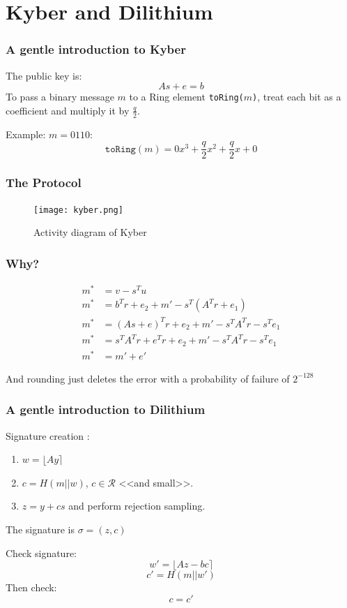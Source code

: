 \documentclass[presentation]{beamer}
\begin{document}
\section{Kyber and Dilithium}
\begin{frame}[label=a-gentle-introduction-to-kyber]
  \frametitle{A gentle introduction to Kyber}
  The public key is:
  \[
    As + e = b
  \]
  To pass a binary message $m$ to a Ring element 
  \texttt{toRing($m$)}, treat each bit as a coefficient and
  multiply it by $\frac{q}{2}$.
  \pause

  Example: $m = 0110$:
  \[
  \texttt{toRing}(m) = 0x^3 + \frac{q}{2}x^2 + \frac{q}{2}x + 0
  \]

\end{frame}
\begin{frame}
  \frametitle{The Protocol}
  \begin{figure}
    \centering
    \texttt{[image: kyber.png]}
    \caption{Activity diagram of Kyber \cite{kyber-spec}}
  \end{figure}
\end{frame}
\begin{frame}
  \frametitle{Why?}
  \begin{equation}
    \begin{array}{rl}
      m^* &= v - s^T u \\
      m^* &= b^T r + e_2 + m' - s^T(A^T r + e_1) \\
      m^* &= (As+e)^Tr + e_2 + m' - s^TA^Tr - s^Te_1 \\
      m^* &= s^TA^Tr + e^Tr + e_2 + m'  - s^TA^Tr - s^Te_1 \\
      m^* &= m' + e'
    \end{array}
  \end{equation}

  And rounding just deletes the error with a probability of
  failure of $2^{-128}$

\end{frame}
\begin{frame}[label=a-gentle-introduction-to-dilithium]
  \frametitle{A gentle introduction to Dilithium}
  Signature creation \cite{dilithium-spec}:
  \begin{enumerate} 
    \item $w = \lfloor Ay \rceil$
    \item $c = H(m || w)$, $c \in \mathcal R$ <<and small>>.
    \item $z = y + cs$ and perform \alert{rejection sampling}.
  \end{enumerate}
  The signature is $\sigma = (z, c)$
  \pause

  Check signature:
  \[w' = \lfloor Az - bc \rceil \]
  \[c' = H(m || w') \]
  Then check:
  \[c = c'\]
\end{frame}
\end{document}
